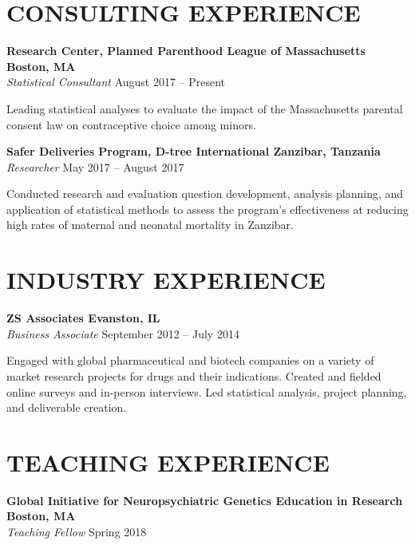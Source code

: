 \documentclass[12pt]{article}
\begin{document}
\section*{\textbf{{\Large C}{\small ONSULTING} {\Large E}{\small XPERIENCE}}}
\textbf{Research Center, Planned Parenthood League of Massachusetts \hfill \hfill Boston, MA}  \\
\textit{ Statistical Consultant} \hfill \hfill August 2017 -- Present
\begin{addmargin}[1em]{2em} Leading statistical analyses to evaluate the impact of the Massachusetts parental consent law on contraceptive choice among minors. \\ \end{addmargin} 

\textbf{Safer Deliveries Program, D-tree International \hfill \hfill Zanzibar, Tanzania} \\
\textit{Researcher} \hfill \hfill May 2017 -- August 2017 
\begin{addmargin}[1em]{2em} Conducted research and evaluation question development, analysis planning, and application of statistical methods to assess the program's effectiveness at reducing high rates of maternal and neonatal mortality in Zanzibar. \end{addmargin}

\section*{\textbf{{\Large I}{\small NDUSTRY} {\Large E}{\small XPERIENCE}}}
\textbf{ZS Associates \hfill \hfill Evanston, IL} \\
\textit{Business Associate} \hfill \hfill September 2012 -- July 2014
\begin{addmargin}[1em]{2em} 
	Engaged with global pharmaceutical and biotech companies on a variety of market research projects for drugs and their indications. Created and fielded online surveys and in-person interviews. Led statistical analysis, project planning, and deliverable creation.
\end{addmargin}

\section*{\textbf{{\Large T}{\small EACHING} {\Large E}{\small XPERIENCE}}}
\textbf{Global Initiative for Neuropsychiatric Genetics Education in Research \hfill \hfill Boston, MA} \\
\textit{Teaching Fellow} \hfill \hfill Spring 2018 \\
\end{document}
